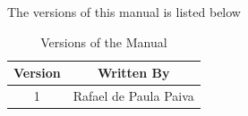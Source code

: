 \documentclass[oneside,a4paper,titlepage]{article}
\begin{document}
The versions of this manual is listed below

\begin{table}[h]
	\begin{center}
		\begin{tabular}{|c|c|}
			\hline
			\textbf{Version} & \textbf{Written By} \\
			\hline
			1 & Rafael de Paula Paiva \\
			\hline
		\end{tabular}
	\end{center}
	\caption{Versions of the Manual}
	\label{tab:manual_version}
\end{table}
\end{document}
